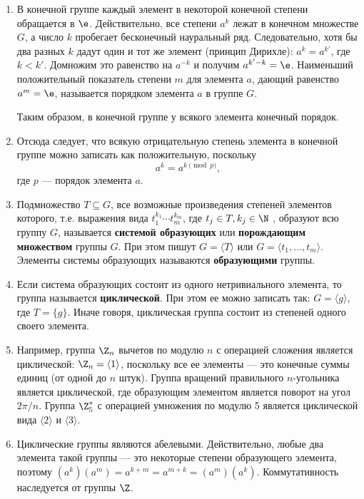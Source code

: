 \begin{enumerate}
\item В конечной группе каждый элемент в некоторой конечной степени обращается в $\e$. Действительно, все степени $a^k$ лежат в конечном множестве $G$, а число $k$ пробегает бесконечный науральный ряд. Следовательно, хотя бы два разных $k$ дадут один и тот же элемент (принцип Дирихле): $a^k=a^{k'}$, где $k<k'$. Домножим это равенство на $a^{-k}$ и получим $a^{k'-k}=\e$. Наименьший положительный показатель степени $m$ для элемента $a$, дающий равенство $a^m=\e$, называется порядком элемента $a$ в группе $G$.

Таким образом, в конечной группе у всякого элемента конечный порядок.

\item Отсюда следует, что всякую отрицательную степень элемента в конечной группе можно записать как положительную, поскольку
$$
a^k = a^{k\pmod p},
$$
где $p$ --- порядок элемента $a$.

\item Подмножество $T\subseteq G$, все возможные произведения степеней элементов которого, т.е. выражения вида $t_1^{k_1}\cdots t_m^{k_m}$, где $t_j\in T, k_j\in\N$ , образуют всю группу $G$, называется \textbf{системой образующих} или \textbf{порождающим множеством} группы $G$. При этом пишут $G=\langle T\rangle$ или $G=\langle t_1,\dots,t_m\rangle$. Элементы системы образующих называются \textbf{образующими} группы.
\item Если система образующих состоит из одного нетривиального элемента, то группа называется \textbf{циклической}. При этом ее можно записать так: $G=\langle g\rangle$, где $T=\{g\}$. Иначе говоря, циклическая группа состоит из степеней одного своего элемента.
\item Например, группа $\Z_n$ вычетов по модулю $n$ с операцией сложения является циклической: $\Z_n=\langle 1\rangle$, поскольку все ее элементы --- это конечные суммы единиц (от одной до $n$ штук). Группа вращений правильного $n$-угольника является циклической, где образующим элементом является поворот на угол $2\pi/n$. Группа $\Z_5^*$ с операцией умножения по модулю 5 является циклической вида $\langle 2\rangle$ и $\langle 3\rangle$.
\item Циклические группы являются абелевыми. Действительно, любые два элемента такой группы --- это некоторые степени образующего элемента, поэтому $(a^k)(a^m)=a^{k+m}=a^{m+k}=(a^m)(a^k)$. Коммутативность наследуется от группы $\Z$.





\end{enumerate}
